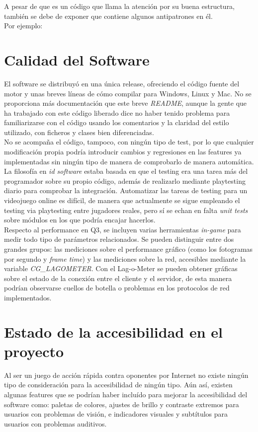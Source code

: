 \documentclass[a4paper,12pt]{report}
\begin{document}
	
	
	
A pesar de que es un código que llama la atención por su buena estructura, también se debe de exponer que contiene algunos antipatrones en él.\\

Por ejemplo:\\

	
	\section{Calidad del Software}
    El software se distribuyó en una única release, ofreciendo el código fuente del motor y unas breves líneas de cómo compilar para Windows, Linux y Mac. No se proporciona más documentación que este breve \textit{README}, aunque la gente que ha trabajado con este código liberado dice no haber tenido problema para familiarizarse con el código usando los comentarios y la claridad del estilo utilizado, con ficheros y clases bien diferenciadas.\\
    
    No se acompaña el código, tampoco, con ningún tipo de test, por lo que cualquier modificación propia podría introducir cambios y regresiones en las features ya implementadas sin ningún tipo de manera de comprobarlo de manera automática. La filosofía en \textit{id software} estaba basada en que el testing era una tarea más del programador sobre su propio código, además de realizarlo mediante playtesting diario para comprobar la integración. Automatizar las tareas de testing para un videojuego online es difícil, de manera que actualmente se sigue empleando el testing via playtesting entre jugadores reales, pero sí se echan en falta \textit{unit tests} sobre módulos en los que podría encajar hacerlos.\\
    
    Respecto al performance en Q3, se incluyen varias herramientas\textit{ in-game }para medir todo tipo de parámetros relacionados. Se pueden distinguir entre dos grandes grupos: las mediciones sobre el performance gráfico (como los fotogramas por segundo y \textit{frame time}) y las mediciones sobre la red, accesibles mediante la variable \textit{CG\_LAGOMETER}. Con el Lag-o-Meter se pueden obtener gráficas sobre el estado de la conexión entre el cliente y el servidor, de esta manera podrían observarse cuellos de botella o problemas en los protocolos de red implementados.
	
	\section{Estado de la accesibilidad en el proyecto}
    Al ser un juego de acción rápida contra oponentes por Internet no existe ningún tipo de consideración para la accesibilidad de ningún tipo. Aún así, existen algunas features que se podrían haber incluído para mejorar la accesibilidad del software como: paletas de colores,  ajustes de brillo y contraste extremos para usuarios con problemas de visión, e indicadores visuales y subtítulos para usuarios con problemas auditivos.
	
\end{document}
